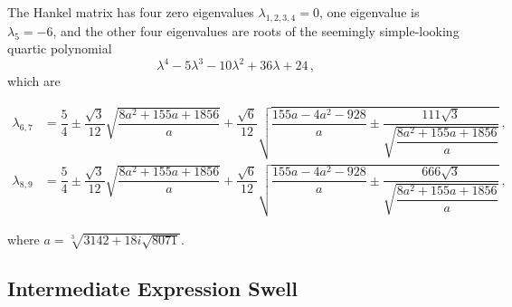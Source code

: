 \begin{example}
  The Hankel matrix has four zero eigenvalues $\lambda_{1,2,3,4} = 0$, one eigenvalue is $\lambda_5 = -6$, and the other four eigenvalues are roots of the seemingly simple-looking quartic polynomial
  \begin{equation*}
    \lambda^4 - 5\lambda^3 - 10\lambda^2 + 36\lambda + 24 \, \text{,}
  \end{equation*}
  which are
  \begin{small}
    \begin{equation*}
      \begin{aligned}
        \lambda_{6,7} &= \dfrac{5}{4} \pm \dfrac{\sqrt{3}}{12}\sqrt{{\dfrac{8a^{2}+155a+1856}{a}}} + \dfrac{\sqrt{6}}{12}\sqrt{{\dfrac{155a-4a^{2}-928}{a}} \pm {\dfrac{111\sqrt{3}}{\sqrt{{\dfrac{8a^{2}+155a+1856}{a}}}}}} \, \text{,} \\[0.2em]
        \lambda_{8,9} &= \dfrac{5}{4} \pm \dfrac{\sqrt{3}}{12}\sqrt{{\dfrac{8a^{2}+155a+1856}{a}}} + \dfrac{\sqrt{6}}{12}\sqrt{{\dfrac{155a-4a^{2}-928}{a}} \pm {\dfrac{666\sqrt{3}}{\sqrt{{\dfrac{8a^{2}+155a+1856}{a}}}}}} \, \text{,}
      \end{aligned}
    \end{equation*}
  \end{small}
  where $a = \sqrt[3]{3142+18i\sqrt{8071}}$.
\end{example}

\subsection{Intermediate Expression Swell}

